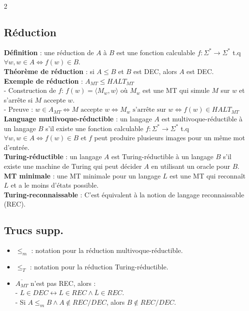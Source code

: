 \documentclass[11pt]{article}
\begin{document}
\begin{multicols}{2}
  \subsection{Réduction}
  \textbf{Définition} : une réduction de $A$ à $B$ est une fonction calculable $f: \Sigma^* \rightarrow \Sigma^*$ t.q $\forall w, w \in A \iff f(w) \in B$.\\
  \textbf{Théorème de réduction} : si $A \leq B$ et $B$ est DEC, alors $A$ est DEC.\\
  \textbf{Exemple de réduction} : $A_{MT} \leq HALT_{MT}$\\
  - Construction de $f$: $f(w) = \langle M_w, w \rangle$ où $M_w$ est une MT qui simule $M$ sur $w$ et s'arrête si $M$ accepte $w$.\\
  - Preuve : $w \in A_{MT} \iff M \text{ accepte } w \iff M_w \text{ s'arrête sur } w \iff f(w) \in HALT_{MT}$\\
  \textbf{Language mutlivoque-réductible} : un langage $A$ est multivoque-réductible à un langage $B$ s'il existe une fonction calculable $f: \Sigma^* \rightarrow \Sigma^*$ t.q $\forall w, w \in A \iff f(w) \in B$ et $f$ peut produire plusieurs images pour un même mot d'entrée.\\
  \textbf{Turing-réductible} : un langage $A$ est Turing-réductible à un langage $B$ s'il existe une machine de Turing qui peut décider $A$ en utilisant un oracle pour $B$.\\
  \textbf{MT minimale} : une MT minimale pour un langage $L$ est une MT qui reconnaît $L$ et a le moins d'états possible.\\
  \textbf{Turing-reconnaissable} : C'est équivalent à la notion de langage reconnaissable (REC).\\
  \subsection{Trucs supp.}
  \begin{itemize}[noitemsep]
    \item \textbf{$\leq_m$} : notation pour la réduction multivoque-réductible.\\
    \item \textbf{$\leq_T$} : notation pour la réduction Turing-réductible.\\
    \item  $\overline{A_{MT}}$ n'est pas REC, alors : \\
           - $L \in DEC \longleftrightarrow L \in REC \wedge \overline{L} \in REC$.\\
           - Si $A \leq_m B \wedge A \notin REC/DEC$, alors $B \notin REC/DEC$.\\
\end{itemize}

\end{multicols}
\end{document}
